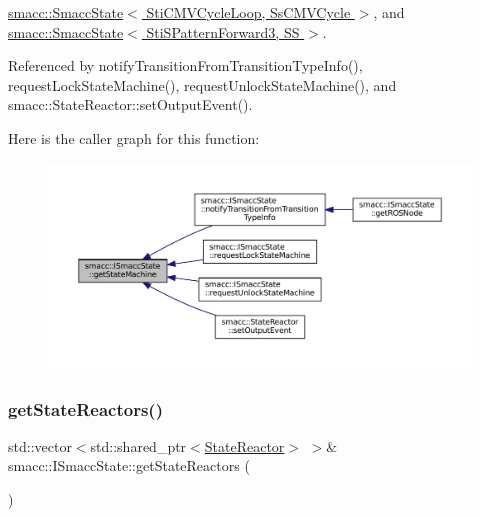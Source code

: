 \hyperlink{classsmacc_1_1SmaccState_afc39f8e0ca4001b2159a100da2fccd0e}{smacc\+::\+Smacc\+State$<$ Sti\+C\+M\+V\+Cycle\+Loop, Ss\+C\+M\+V\+Cycle $>$}, and \hyperlink{classsmacc_1_1SmaccState_afc39f8e0ca4001b2159a100da2fccd0e}{smacc\+::\+Smacc\+State$<$ Sti\+S\+Pattern\+Forward3, S\+S $>$}.



Referenced by notify\+Transition\+From\+Transition\+Type\+Info(), request\+Lock\+State\+Machine(), request\+Unlock\+State\+Machine(), and smacc\+::\+State\+Reactor\+::set\+Output\+Event().

Here is the caller graph for this function\+:
\nopagebreak
\begin{figure}[H]
\begin{center}
\leavevmode
\includegraphics[width=350pt]{classsmacc_1_1ISmaccState_a562bb3f9a3ac16b8be71e4794c9e7523_icgraph}
\end{center}
\end{figure}
\mbox{\label{classsmacc_1_1ISmaccState_acc40f4b3dd02a39242c7e23fe13c3e16}} 
\subsubsection{\texorpdfstring{get\+State\+Reactors()}{getStateReactors()}}
{\footnotesize\ttfamily std\+::vector$<$std\+::shared\+\_\+ptr$<$\hyperlink{classsmacc_1_1StateReactor}{State\+Reactor}$>$ $>$\& smacc\+::\+I\+Smacc\+State\+::get\+State\+Reactors (\begin{DoxyParamCaption}{ }\end{DoxyParamCaption})\hspace{0.3cm}{\ttfamily [inline]}}



